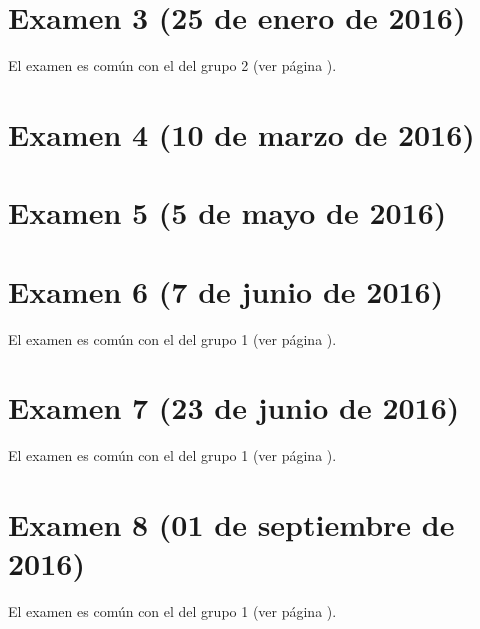 \documentclass[a4paper,12pt,twoside]{book}
\begin{document}
\section{Examen 3 (25 de enero de 2016)}
El examen es común con el del grupo 2 (ver página \pageref{examen_15_16_2_3}).
\section{Examen 4 (10 de marzo de 2016)}
\section{Examen 5 (5 de mayo de 2016)}
\section{Examen 6 (7 de junio de 2016)} 
El examen es común con el del grupo 1 (ver página \pageref{examen_15_16_1_6}).
\section{Examen 7 (23 de junio de 2016)}
El examen es común con el del grupo 1 (ver página \pageref{examen_15_16_1_7}).
\section{Examen 8 (01 de septiembre de 2016)}
El examen es común con el del grupo 1 (ver página \pageref{examen_15_16_1_8}).

\appendix %






\nocite{Alonso-12b}
\nocite{Bird-99a}
\nocite{Cunningham-10a}
\nocite{Daume-06}
\nocite{Davie-92a}
\nocite{Doets-04a}
\nocite{Fokker-96}
\nocite{Hudak-00a}
\nocite{Hudak-12a}
\nocite{Hutton-07a}
\nocite{OSullivan-08a}
\nocite{Rabhi-99a}
\nocite{Polya-65a}
\nocite{Ruiz-04}
\nocite{Thompson-11a}



\end{document}
